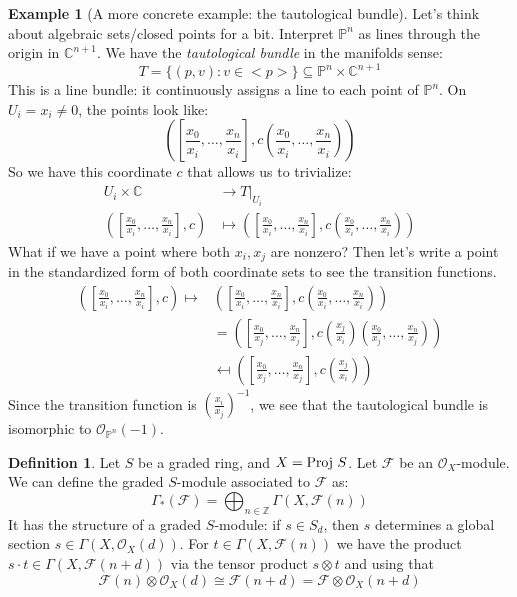 \documentclass[10pt,reqno]{amsart}
\theoremstyle{definition}
\newtheorem{example}[theorem]{Example}
\newtheorem{definition}[theorem]{Definition}
\theoremstyle{remark}
\numberwithin{equation}{section}
\numberwithin{theorem}{section}
\newcommand{\C}{{\mathbb C}}
\newcommand{\OO}{{\mathcal O}}
\newcommand{\proj}{\textup{Proj }}
\newcommand{\FF}{{\mathscr F}}
\newcommand{\PP}{{\mathbb P}}
\begin{document}
\begin{example}[A more concrete example: the tautological bundle] Let's think about algebraic sets/closed points for a bit. Interpret $\PP^n$ as lines through the origin in $\C^{n+1}$. We have the \textit{tautological bundle} in the manifolds sense:
\[T = \{(p, v) : v \in <p> \} \subseteq \PP^n \times \C^{n+1}\]
This is a line bundle: it continuously assigns a line to each point of $\PP^n$. On $U_i = x_i \ne 0$, the points look like:
\[\left( \left[ \frac{x_0}{x_i},\dots, \frac{x_n}{x_i} \right], c \left(\frac{x_0}{x_i},\dots, \frac{x_n}{x_i }\right)\right)\]
So we have this coordinate $c$ that allows us to trivialize:
\begin{align*}
U_i \times \C &\to T|_{U_i}\\
\left( \left[ \frac{x_0}{x_i},\dots, \frac{x_n}{x_i} \right], c \right) &\mapsto \left( \left[ \frac{x_0}{x_i},\dots, \frac{x_n}{x_i} \right], c \left(\frac{x_0}{x_i},\dots, \frac{x_n}{x_i}\right)\right)
\end{align*}
What if we have a point where both $x_i,x_j$ are nonzero? Then let's write a point in the standardized form of both coordinate sets to see the transition functions.
\begin{align*}
\left( \left[ \frac{x_0}{x_i},\dots, \frac{x_n}{x_i} \right], c \right) \mapsto &\left( \left[ \frac{x_0}{x_i},\dots, \frac{x_n}{x_i} \right], c \left(\frac{x_0}{x_i},\dots, \frac{x_n}{x_i}\right)\right) \\
& = \left( \left[ \frac{x_0}{x_j},\dots, \frac{x_n}{x_j} \right], c \left(\frac{x_j}{x_i}\right) \left(\frac{x_0}{x_j},\dots, \frac{x_n}{x_j}\right)\right) \\
&\mapsfrom \left( \left[ \frac{x_0}{x_j},\dots, \frac{x_n}{x_j} \right], c \left(\frac{x_j}{x_i}\right)\right) 
\end{align*}
Since the transition function is $(\frac{x_i}{x_j})^{-1}$, we see that the tautological bundle is isomorphic to $\OO_{\PP^n}(-1)$.
\end{example}

\begin{definition} Let $S$ be a graded ring, and $X = \proj S$. Let $\FF$ be an $\OO_X$-module. We can define the graded $S$-module associated to $\FF$ as:
\[\Gamma_{*}(\FF) = \bigoplus_{n \in \mathbb{Z}} \Gamma(X,\FF(n))\]
It has the structure of a graded $S$-module: if $s \in S_d$, then $s$ determines a global section $s \in \Gamma(X,\OO_X(d))$. For $t \in \Gamma(X,\FF(n))$ we have the product $s \cdot t \in \Gamma(X, \FF(n+d))$ via the tensor product $s \otimes t$ and using that
\[\FF(n) \otimes \OO_X (d) \cong \FF(n+d) = \FF \otimes \OO_{X}(n+d) \]
\end{definition}
\end{document}
